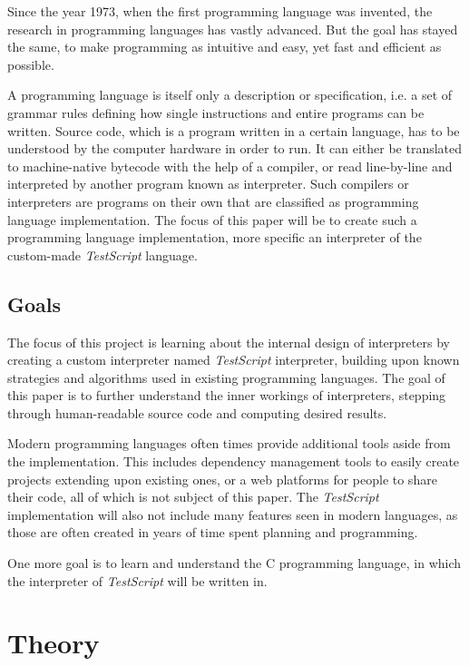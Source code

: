 \documentclass[12pt,a4paper]{article}
\newcommand{\name}{\emph{TestScript}}
\begin{document}
Since the year 1973, when the first programming language was invented, the
research in programming languages has vastly advanced. But the goal has stayed
the same, to make programming as intuitive and easy, yet fast and efficient as
possible.

A programming language is itself only a description or specification, i.e. a
set of grammar rules defining how single instructions and entire programs
can be written. Source code, which is a program written in a certain language,
has to be understood by the computer hardware in order to run. It can either
be translated to machine-native bytecode with the help of a compiler, or
read line-by-line and interpreted by another program known as interpreter.
Such compilers or interpreters are programs on their own that are classified
as programming language implementation. The focus of this paper will be to
create such a programming language implementation, more specific an interpreter
of the custom-made \name{} language.

\subsection{Goals}
The focus of this project is learning about the internal design of interpreters
by creating a custom interpreter named \name{} interpreter, building upon
known strategies and algorithms used in existing programming languages.
The goal of this paper is to further understand the inner workings of
interpreters, stepping through human-readable source code and computing
desired results.

Modern programming languages often times provide additional tools aside from
the implementation. This includes dependency management tools to
easily create projects extending upon existing ones, or a web platforms for
people to share their code, all of which is not subject of this paper.
The \name{} implementation will also not include many features seen in modern
languages, as those are often created in years of time spent planning and
programming.

One more goal is to learn and understand the C programming language, in which
the interpreter of \name{} will be written in.

\section{Theory}
\end{document}
